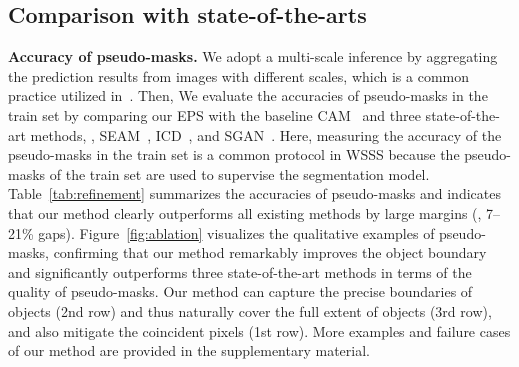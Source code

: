 \documentclass[final]{cvpr}
\begin{document}
\subsection{Comparison with state-of-the-arts}
\label{section5.3}

\noindent \textbf{Accuracy of pseudo-masks.} We adopt a multi-scale inference by aggregating the prediction results from images with different scales, which is a common practice utilized in~\cite{ahn2018learning,wang2020self}. Then, We evaluate the accuracies of pseudo-masks in the train set by comparing our EPS with the baseline CAM~\cite{zhou2016learning} and three state-of-the-art methods, \ie, SEAM~\cite{wang2020self}, ICD~\cite{fan2020learning}, and SGAN~\cite{yao2020saliency}. Here, measuring the accuracy of the pseudo-masks in the train set is a common protocol in WSSS because the pseudo-masks of the train set are used to supervise the segmentation model. Table~\ref{tab:refinement} summarizes the accuracies of pseudo-masks and indicates that our method clearly outperforms all existing methods by large margins (\ie, 7--21\% gaps). Figure~\ref{fig:ablation} visualizes the qualitative examples of pseudo-masks, confirming that our method remarkably improves the object boundary and significantly outperforms three state-of-the-art methods in terms of the quality of pseudo-masks. Our method can capture the precise boundaries of objects (2nd row) and thus naturally cover the full extent of objects (3rd row), and also mitigate the coincident pixels (1st row). More examples and failure cases of our method are provided in the supplementary material.
\end{document}
